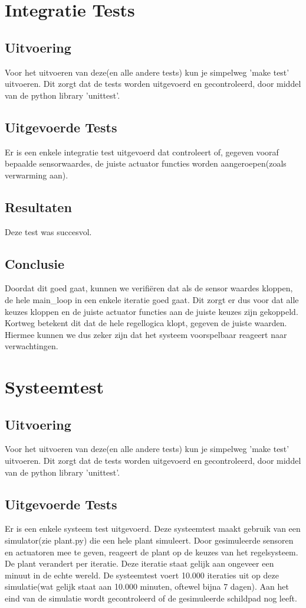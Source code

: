 \documentclass[a4paper]{report}
\begin{document}
\chapter{Integratie Tests}
\section{Uitvoering}
Voor het uitvoeren van deze(en alle andere tests) kun je simpelweg 'make test' uitvoeren. Dit zorgt dat de tests worden uitgevoerd en gecontroleerd, door middel van de python library 'unittest'.
\section{Uitgevoerde Tests}
Er is een enkele integratie test uitgevoerd dat controleert of, gegeven vooraf bepaalde sensorwaardes, de juiste actuator functies worden aangeroepen(zoals verwarming aan).

\section{Resultaten}
Deze test was succesvol. 

\section{Conclusie}
Doordat dit goed gaat, kunnen we verifiëren dat als de sensor waardes kloppen, de hele main\_loop in een enkele iteratie goed gaat.
Dit zorgt er dus voor dat alle keuzes kloppen en de juiste actuator functies aan de juiste keuzes zijn gekoppeld.
Kortweg betekent dit dat de hele regellogica klopt, gegeven de juiste waarden. Hiermee kunnen we dus zeker zijn dat het systeem voorspelbaar reageert naar verwachtingen.

\chapter{Systeemtest}
\section{Uitvoering}
Voor het uitvoeren van deze(en alle andere tests) kun je simpelweg 'make test' uitvoeren. Dit zorgt dat de tests worden uitgevoerd en gecontroleerd, door middel van de python library 'unittest'.
\section{Uitgevoerde Tests}
Er is een enkele systeem test uitgevoerd.
Deze systeemtest maakt gebruik van een simulator(zie plant.py) die een hele plant simuleert. 
Door gesimuleerde sensoren en actuatoren mee te geven, reageert de plant op de keuzes van het regelsysteem.
De plant verandert per iteratie. Deze iteratie staat gelijk aan ongeveer een minuut in de echte wereld.
De systeemtest voert 10.000 iteraties uit op deze simulatie(wat gelijk staat aan 10.000 minuten, oftewel bijna 7 dagen).
Aan het eind van de simulatie wordt gecontroleerd of de gesimuleerde schildpad nog leeft. 
\end{document}
